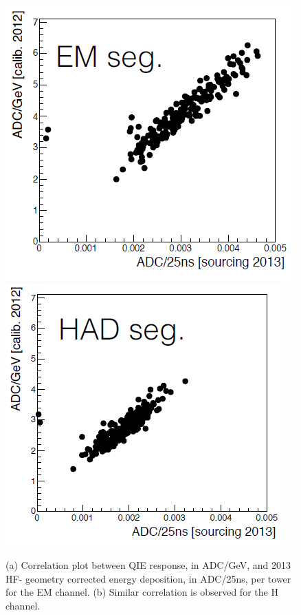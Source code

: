 \begin{figure}[htb]
   \begin{center}
      \includegraphics[width=.45\textwidth]{figures/ch_hfcalibration/QIE_Res_EM.png}
      \includegraphics[width=.45\textwidth]{figures/ch_hfcalibration/QIE_Res_H.png}
      \caption{(a) Correlation plot between QIE response, in ADC/GeV, and 2013 HF-
               geometry corrected energy deposition, in ADC/25\unit{ns}, per tower
               for the EM channel.
               (b) Similar correlation is observed for the H channel.}
      \label{fig:QIE_Slope}
   \end{center}
\end{figure}

